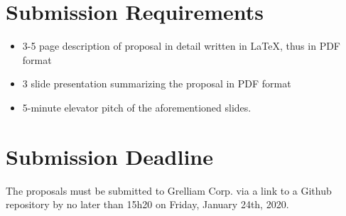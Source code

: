 \documentclass[12pt]{article}
\begin{document}
\section{Submission Requirements}
\begin{itemize}[noitemsep]
	\item 3-5 page description of proposal in detail written in \LaTeX, thus in PDF format
	\item 3 slide presentation summarizing the proposal in PDF format
	\item 5-minute elevator pitch of the aforementioned slides.
\end{itemize}
 
\section{Submission Deadline}
The proposals must be submitted to Grelliam Corp. via a link to a Github repository by no later than 15h20 on Friday,
January 24th, 2020.
\end{document}

